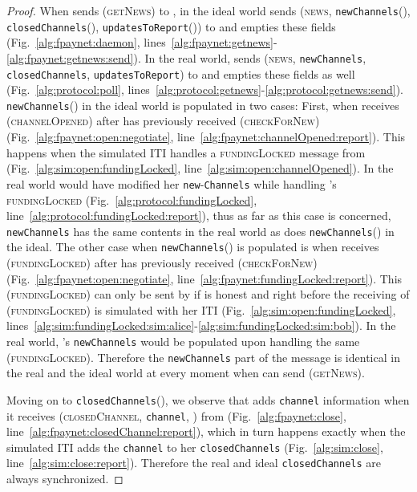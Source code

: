 \begin{proof}
  When \environment{} sends (\textsc{getNews}) to \alice, in the ideal world
  \fpaynet{} sends (\textsc{news}, \texttt{newChannels}(\alice),
  \texttt{closedChannels}(\alice), \texttt{updatesToReport}\linebreak(\alice))
  to \environment{} and empties these fields (Fig.~\ref{alg:fpaynet:daemon},
  lines~\ref{alg:fpaynet:getnews}-\ref{alg:fpaynet:getnews:send}). In the real
  world, \alice{} sends (\textsc{news}, \texttt{newChannels},
  \texttt{closedChannels}, \texttt{updatesToReport}) to \environment{} and
  empties these fields as well (Fig.~\ref{alg:protocol:poll},
  lines~\ref{alg:protocol:getnews}-\ref{alg:protocol:getnews:send}).
  \texttt{newChannels}(\alice) in the ideal world is populated in two cases:
  First, when \fpaynet{} receives (\textsc{channelOpened}) after \alice{} has
  previously received (\textsc{checkForNew})
  (Fig.~\ref{alg:fpaynet:open:negotiate},
  line~\ref{alg:fpaynet:channelOpened:report}). This happens when the simulated
  \alice{} ITI handles a \textsc{fundingLocked} message from \bob{}
  (Fig.~\ref{alg:sim:open:fundingLocked},
  line~\ref{alg:sim:open:channelOpened}). In the real world \alice{} would have
  modified her \texttt{new}-\linebreak\texttt{Channels} while handling \bob's
  \textsc{fundingLocked} (Fig.~\ref{alg:protocol:fundingLocked},
  line~\ref{alg:protocol:fundingLocked:report}), thus as far as this case is
  concerned, \texttt{newChannels} has the same contents in the real world as
  does \texttt{newChannels}(\alice) in the ideal. The other case when
  \texttt{newChannels}(\alice) is populated is when \fpaynet{} receives
  (\textsc{fundingLocked}) after \bob{} has previously received
  (\textsc{checkForNew}) (Fig.~\ref{alg:fpaynet:open:negotiate},
  line~\ref{alg:fpaynet:fundingLocked:report}). This (\textsc{fundingLocked})
  can only be sent by \simulator{} if \alice{} is honest and right before the
  receiving of (\textsc{fundingLocked}) is simulated with her ITI
  (Fig.~\ref{alg:sim:open:fundingLocked},
  lines~\ref{alg:sim:fundingLocked:sim:alice}-\ref{alg:sim:fundingLocked:sim:bob}).
  In the real world, \alice's \texttt{newChannels} would be populated upon
  handling the same (\textsc{fundingLocked}). Therefore the \texttt{newChannels}
  part of the message is identical in the real and the ideal world at every
  moment when \environment{} can send (\textsc{getNews}).

  Moving on to \texttt{closedChannels}(\alice), we observe that \fpaynet{} adds
  \texttt{channel} information when it receives (\textsc{closedChannel},
  \texttt{channel}, \alice) from \simulator{} (Fig.~\ref{alg:fpaynet:close},
  line~\ref{alg:fpaynet:closedChannel:report}), which in turn happens exactly
  when the simulated \alice{} ITI adds the \texttt{channel} to her
  \texttt{closedChannels} (Fig.~\ref{alg:sim:close},
  line~\ref{alg:sim:close:report}). Therefore the real and ideal
  \texttt{closedChannels} are always synchronized.


\end{proof}
